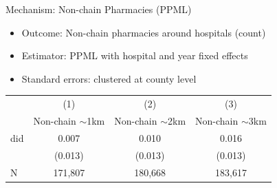 \documentclass{beamer}
\begin{document}
\begin{frame}{Mechanism: Non-chain Pharmacies (PPML)}

\begin{itemize}
    \item Outcome: Non-chain pharmacies around hospitals (count)
    \item Estimator: PPML with hospital and year fixed effects
    \item Standard errors: clustered at county level
\end{itemize}

\vspace{0.5em}
\centering
\footnotesize
\begin{tabular}{lccc}
\hline
\hline
 & (1) & (2) & (3) \\
 & Non-chain $\sim$1km & Non-chain $\sim$2km & Non-chain $\sim$3km \\
\hline
did & 0.007 & 0.010 & 0.016 \\
    & (0.013) & (0.013) & (0.013) \\
\hline
N   & 171,807 & 180,668 & 183,617 \\
\hline
\hline
\end{tabular}
\end{frame}
\end{document}
